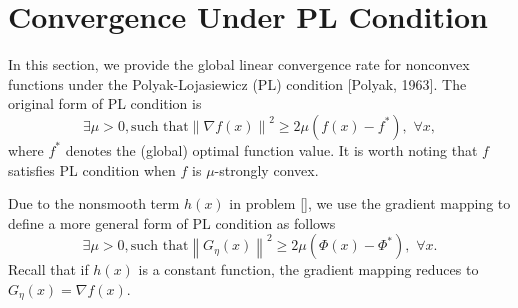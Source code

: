 \documentclass{article}
\newcommand{\norm}[1]{\left\lVert#1\right\rVert}
\theoremstyle{definition}
\theoremstyle{remark}
\begin{document}
\section{Convergence Under PL Condition}
In this section, we provide the global linear convergence rate for nonconvex functions under the Polyak-Lojasiewicz
(PL) condition [Polyak, 1963]. The original form of PL condition is
\begin{equation}
\exists \mu >0, \text{such~that} \norm{\nabla f(x)}^2 \geq 2\mu (f(x) - f^*),\,\, \forall x,
\end{equation}
where $f^*$ denotes the (global) optimal function value. It is worth noting that $f$ satisfies PL condition when $f$ is $\mu$-strongly convex.

Due to the nonsmooth term $h(x)$ in problem \eqref{}, we use the gradient mapping to define a more general form of PL condition as follows
\begin{equation}
\exists \mu >0, \text{such~that} \norm{G_{\eta}(x)}^2 \geq 2\mu (\Phi(x) - \Phi^*),\,\, \forall x.
\end{equation}
Recall that if $h(x)$ is a constant function, the gradient mapping reduces to $G_{\eta}(x) = \nabla f(x)$.
\end{document}
